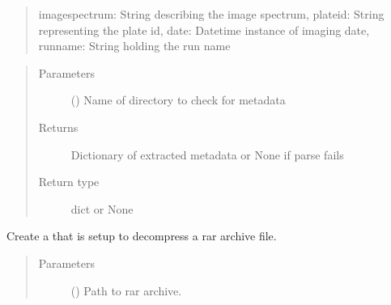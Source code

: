 \documentclass[letterpaper,10pt,english]{sphinxmanual}
\begin{document}
\begin{fulllineitems}
\begin{fulllineitems}
\begin{quote}
\begin{sphinxVerbatim}[commandchars=\\\{\}]
\PYGZob{}\PYGZsq{}image\PYGZus{}spectrum\PYGZsq{}: String describing the image spectrum,
\PYGZsq{}plate\PYGZus{}id\PYGZsq{}: String representing the plate id,
\PYGZsq{}date\PYGZsq{}: Datetime instance of imaging date,
\PYGZsq{}run\PYGZus{}name\PYGZsq{}: String holding the run name
\PYGZcb{}
\end{sphinxVerbatim}
\end{quote}
\begin{quote}\begin{description}
\item[{Parameters}] \leavevmode
{} () \textendash{} Name of directory to check for metadata

\item[{Returns}] \leavevmode
Dictionary of extracted metadata or None if parse fails

\item[{Return type}] \leavevmode
dict or None

\end{description}\end{quote}

\end{fulllineitems}


\begin{fulllineitems}
\label{\detokenize{polo.utils:polo.utils.io_utils.RunImporter.unpack_rar_archive_thread}}
Create a  that is setup to de\sphinxhyphen{}compress
a rar archive file.
\begin{quote}\begin{description}
\item[{Parameters}] \leavevmode
{} () \textendash{} Path to rar archive.


\end{description}
\end{quote}
\end{fulllineitems}
\end{fulllineitems}
\end{document}
